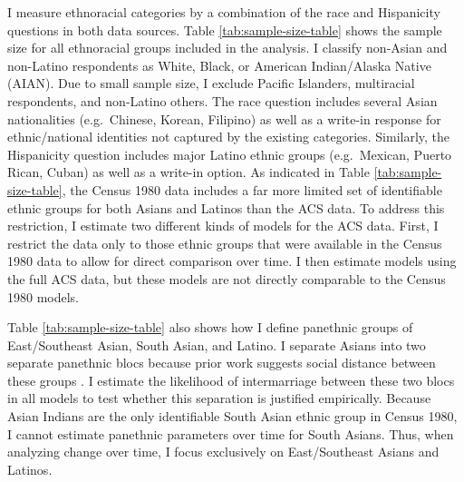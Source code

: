 \documentclass[11pt,]{article}
\begin{document}
I measure ethnoracial categories by a combination of the race and Hispanicity questions in both data sources. Table \ref{tab:sample-size-table} shows the sample size for all ethnoracial groups included in the analysis. I classify non-Asian and non-Latino respondents as White, Black, or American Indian/Alaska Native (AIAN). Due to small sample size, I exclude Pacific Islanders, multiracial respondents, and non-Latino others. The race question includes several Asian nationalities (e.g.~Chinese, Korean, Filipino) as well as a write-in response for ethnic/national identities not captured by the existing categories. Similarly, the Hispanicity question includes major Latino ethnic groups (e.g.~Mexican, Puerto Rican, Cuban) as well as a write-in option. As indicated in Table \ref{tab:sample-size-table}, the Census 1980 data includes a far more limited set of identifiable ethnic groups for both Asians and Latinos than the ACS data. To address this restriction, I estimate two different kinds of models for the ACS data. First, I restrict the data only to those ethnic groups that were available in the Census 1980 data to allow for direct comparison over time. I then estimate models using the full ACS data, but these models are not directly comparable to the Census 1980 models.

Table \ref{tab:sample-size-table} also shows how I define panethnic groups of East/Southeast Asian, South Asian, and Latino. I separate Asians into two separate panethnic blocs because prior work suggests social distance between these groups \citep{kibria_not_1996, morning_racial_2001, schachter_finding_2014}. I estimate the likelihood of intermarriage between these two blocs in all models to test whether this separation is justified empirically. Because Asian Indians are the only identifiable South Asian ethnic group in Census 1980, I cannot estimate panethnic parameters over time for South Asians. Thus, when analyzing change over time, I focus exclusively on East/Southeast Asians and Latinos.
\end{document}
